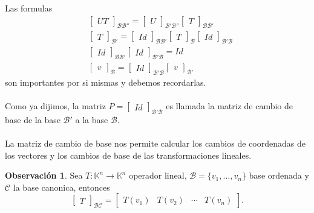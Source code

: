 \documentclass{article}
\theoremstyle{definition}
\theoremstyle{definition}
\newtheorem*{obs}{Observación}
\theoremstyle{remark}
\begin{document}
Las formulas \begin{align}
  &\begin{bmatrix}UT\end{bmatrix}_{\mathcal{B}{\mathcal{B''}}}=\begin{bmatrix}U\end{bmatrix}_{\mathcal{B'}\mathcal{B''}}\begin{bmatrix}T\end{bmatrix}_{\mathcal{B}\mathcal{B'}} \tag{0} \\
  &\begin{bmatrix}T\end{bmatrix}_{\mathcal{B'}} = \begin{bmatrix}Id \end{bmatrix}_{\mathcal{B}\mathcal{B'}}\begin{bmatrix}T\end{bmatrix}_{\mathcal{B}}\begin{bmatrix}Id\end{bmatrix}_{\mathcal{B'}{\mathcal{B}}} \tag{*} \\
  &\begin{bmatrix}Id\end{bmatrix}_{\mathcal{B}\mathcal{B}'}\begin{bmatrix}Id\end{bmatrix}_{\mathcal{B'}{\mathcal{B}}}=Id \tag{**} \\
  &\begin{bmatrix}v\end{bmatrix}_{\mathcal{B}}=\begin{bmatrix}Id\end{bmatrix}_{\mathcal{B'}\mathcal{B}}\begin{bmatrix}v\end{bmatrix}_{\mathcal{B'}} \tag{***}
\end{align}
son importantes por si mismas y debemos recordarlas. \\\\ Como ya dijimos, la matriz $P = \begin{bmatrix}Id\end{bmatrix}_{\mathcal{B'}\mathcal{B}}$ es llamada la matriz de cambio de base de la base $\mathcal{B}'$ a la base $\mathcal{B}$. \\\\ La matriz de cambio de base nos permite calcular los cambios de coordenadas de los vectores y los cambios de base de las transformaciones lineales.
\begin{obs}
  Sea $T : \mathbb{K}^n \to \mathbb{K}^n$ operador lineal, $\mathcal{B}=\{v_1, \dots ,v_n\}$ base ordenada y $\mathcal{C}$ la base canonica, entonces \[
    \begin{bmatrix}T\end{bmatrix}_{\mathcal{B}\mathcal{C}}=\begin{bmatrix}T(v_1) & T(v_2) & \cdots & T(v_n) \end{bmatrix}.
  \]
\end{obs}
\end{document}
